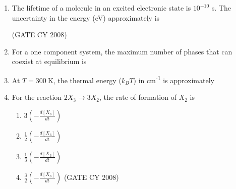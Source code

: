 \documentclass[12pt]{article}
\begin{document}
\begin{enumerate}
    

    \item The lifetime of a molecule in an excited electronic state is $10^{-10}$ s. The uncertainty in the energy (eV) approximately is
    \begin{enumerate}
 \hfill{(GATE CY 2008)}
\end{enumerate}
    

    \item For a one component system, the maximum number of phases that can coexist at equilibrium is
    \begin{enumerate}
\end{enumerate}
    

    \item At $T = 300 \ \mathrm{K}$, the thermal energy ($k_B T$) in cm\textsuperscript{-1} is approximately
    \begin{enumerate}
\end{enumerate}

    

    \item For the reaction $2 X_3 \rightarrow 3 X_2$, the rate of formation of $X_2$ is
\begin{enumerate}

\item $3 \left(-\frac{d[X_3]}{dt}\right)$ 
\item $\frac{1}{2} \left(-\frac{d[X_3]}{dt}\right)$ 
\item $\frac{1}{3} \left(-\frac{d[X_3]}{dt}\right)$ 
\item $\frac{3}{2} \left(-\frac{d[X_3]}{dt}\right)$    \hfill{(GATE CY 2008)}
\end{enumerate}




\end{enumerate}
\end{document}

